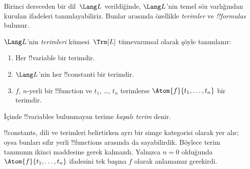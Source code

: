 \documentclass[../../../include/open-logic-section]{subfiles}
\begin{document}


Birinci dereceden bir dil~$\Lang L$ verildiğinde, $\Lang L$'nin temel söz
varlığından kurulan ifadeleri tanımlayabiliriz. Bunlar arasında özellikle
\emph{terimler} ve \emph{!!{formula}s} bulunur.

\begin{defn}[Terimler]
$\Lang L$'nin \emph{terimleri} kümesi~$\Trm[L]$ tümevarımsal olarak
şöyle tanımlanır:
\begin{enumerate}
\item Her !!{variable} bir terimdir.
\item $\Lang L$'nin her !!{constant}{}i bir terimdir.
\item $f$, $n$-yerli bir !!{function} ve $t_1$, \dots, $t_n$
  terimlerse $\Atom{f}{t_1, \ldots, t_n}$ bir terimdir.
\end{enumerate}
İçinde !!{variable}s bulunmayan terime \emph{kapalı terim} denir.
\end{defn}

\begin{explain}
!!{constant}s, dili ve terimleri belirtirken ayrı bir simge kategorisi
olarak yer alır; oysa bunları sıfır yerli !!{function}s arasında da
sayabilirdik. Böylece terim tanımının ikinci maddesine gerek kalmazdı.
Yalnızca $n = 0$ olduğunda $\Atom{f}{t_1, \ldots, t_n}$ ifadesini tek
başına $f$ olarak anlamamız gerekirdi.
\end{explain}
\end{document}
